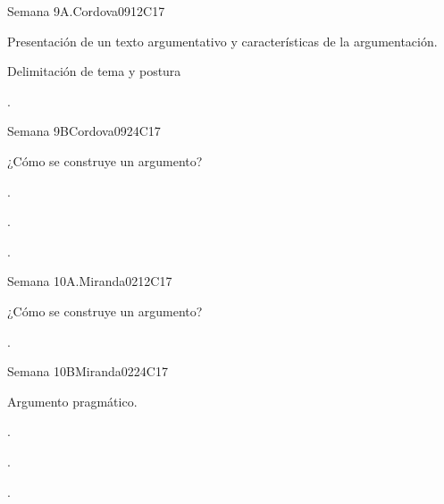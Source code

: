 \begin{syllabus}
\begin{unit}{Semana 9A.}{}{Cordova09}{12}{C17}
   \begin{topics}
      \item Presentación de un texto argumentativo y características de la argumentación.
      \item Delimitación de tema y postura

   \end{topics}
   \begin{learningoutcomes}
      \item . 
   \end{learningoutcomes}
\end{unit}

\begin{unit}{Semana 9B}{}{Cordova09}{24}{C17}
   \begin{topics}
      \item ¿Cómo se construye un argumento?
   \end{topics}

   \begin{learningoutcomes}
      \item . 
      \item .
      \item . 
      \end{learningoutcomes}
\end{unit}

\begin{unit}{Semana 10A.}{}{Miranda02}{12}{C17}
   \begin{topics}
      \item ¿Cómo se construye un argumento?
   \end{topics}
   \begin{learningoutcomes}
      \item . 
   \end{learningoutcomes}
\end{unit}

\begin{unit}{Semana 10B}{}{Miranda02}{24}{C17}
   \begin{topics}
      \item  Argumento pragmático.
   \end{topics}

   \begin{learningoutcomes}
      \item . 
      \item .
      \item . 
      \end{learningoutcomes}
\end{unit}


\end{syllabus}
